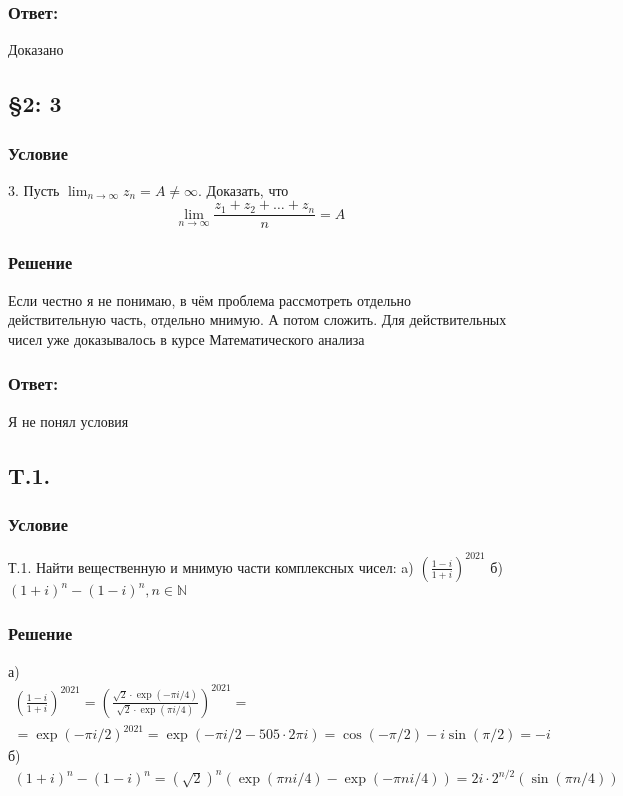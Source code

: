 \documentclass{article}
\begin{document}
\subsubsection*{Ответ:}
Доказано

\subsection{\S2: 3}
\subsubsection*{Условие}
3. Пусть $\lim _{n \rightarrow \infty} z_{n}=A \neq \infty .$ Доказать, что
$$
\lim _{n \rightarrow \infty} \frac{z_{1}+z_{2}+\ldots+z_{n}}{n}=A
$$
\subsubsection*{Решение}
Если честно я не понимаю, в чём проблема рассмотреть отдельно действительную часть, отдельно мнимую. А потом сложить. Для действительных чисел уже доказывалось в курсе Математического анализа
\subsubsection*{Ответ:}
Я не понял условия

\subsection{T.1.}
\subsubsection*{Условие}
Т.1. Найти вещественную и мнимую части комплексных чисел:
a) $\left(\frac{1-i}{1+i}\right)^{2021}$
б) $(1+i)^{n}-(1-i)^{n}, n \in \mathbb{N}$
\subsubsection*{Решение}
а) \begin{gather*}
    \left(\frac{1-i}{1+i}\right)^{2021} = \left( \frac{\sqrt 2 \cdot \exp{(-\pi i /4)}}{\sqrt 2 \cdot \exp{(\pi i /4)}}\right)^{2021}=\\
    =\exp{(-\pi i /2)}^{2021} = \exp{(-\pi i /2 - 505 \cdot 2\pi i)} = \cos(-\pi/2) - i \sin(\pi/2) = -i
\end{gather*}     
б) \begin{gather*}
    (1+i)^{n}-(1-i)^{n} =\left (\sqrt 2 \right)^n (\exp{(\pi n i /4)} - \exp{(-\pi n i /4)}) = 2i \cdot 2^{n/2} (\sin{( \pi n /4)})
\end{gather*} 
\end{document}
